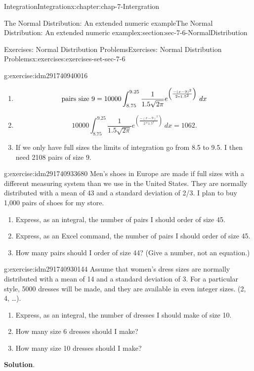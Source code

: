 \documentclass[oneside,10pt,]{book}
\numberwithin{equation}{section}
\begin{document}
\begin{chapterptx}{Integration}{}{Integration}{}{}{x:chapter:chap-7-Intergration}
\begin{sectionptx}{The Normal Distribution: An extended numeric example}{}{The Normal Distribution: An extended numeric example}{}{}{x:section:sec-7-6-NormalDistribution}
\begin{exercises-subsection}{Exercises: Normal Distribution Problems}{}{Exercises: Normal Distribution Problems}{}{}{x:exercises:exercises-set-sec-7-6}
\begin{divisionexercise}{1}{}{}{g:exercise:idm291740940016}
\begin{enumerate}[label=(\alph*)]
\textgreater{} \item{}%
\begin{equation*}
\hbox{pairs size 9}=10000\int_{8.75}^{9.25}
\frac{1}{1.5\sqrt{2\pi}}e^{\left({\frac{-(x-9)^2}{2*1.5^2}}\right)}\ dx
\end{equation*}
%
\item{}%
\begin{equation*}
10000\int_{8.75}^{9.25} \frac{1}{1.5\sqrt{2\pi}} e^{\left({\frac{-(x-9)^2}{2*1.5^2}}\right)}\ dx=1062.
\end{equation*}
%
\item{}If we only have full sizes the limits of integration go from 8.5 to 9.5.  I then need 2108 pairs of size 9.%
\end{enumerate}
\end{divisionexercise}%
\begin{divisionexercise}{2}{}{}{g:exercise:idm291740933680}%
Men's shoes in Europe are made if full sizes with a different measuring system than we use in the United States.  They are normally distributed with a mean of 43 and a standard deviation of 2\slash{}3.  I plan to buy 1,000 pairs of shoes for my store.%
%
\begin{enumerate}[label=(\alph*)]
\item{}Express, as an integral, the number of pairs I should order of size 45.%
\item{}Express, as an Excel command, the number of pairs I should order of size 45.%
\item{}How many pairs should I order of size 44?  (Give a number, not an equation.)%
\end{enumerate}
\end{divisionexercise}%
\begin{divisionexercise}{3}{}{}{g:exercise:idm291740930144}%
Assume that women’s dress sizes are normally distributed with a mean of 14 and a standard deviation of 3.  For a particular style, 5000 dresses will be made, and they are available in even integer sizes.  (2, 4, …).%
%
\begin{enumerate}[label=(\alph*)]
\item{}Express, as an integral, the number of dresses I should make of size 10.%
\item{}How many size 6 dresses should I make?%
\item{}How many size 10 dresses should I make?%
\end{enumerate}
\par\smallskip%
\noindent\textbf{Solution}.\hypertarget{g:solution:idm291740926848}{}\quad{}%

\end{divisionexercise}
\end{exercises-subsection}
\end{sectionptx}
\end{chapterptx}
\end{document}
